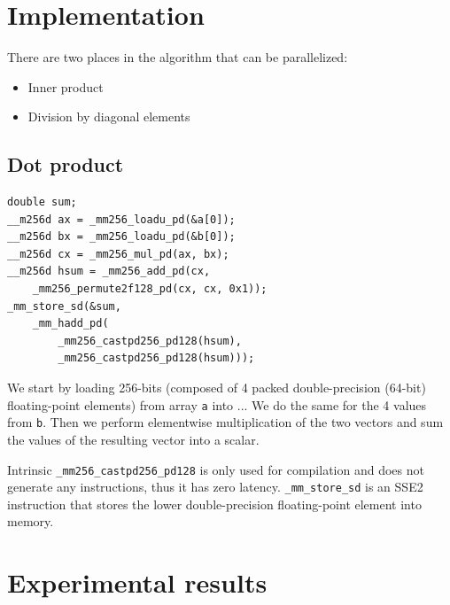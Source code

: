 \documentclass[sigplan]{acmart}
\begin{document}
\section{Implementation}
There are two places in the algorithm that can be parallelized:

\begin{itemize}
\item Inner product
\item Division by diagonal elements
\end{itemize}


\subsection{Dot product}

\lstset {language=C++}
\begin{lstlisting}
double sum;
__m256d ax = _mm256_loadu_pd(&a[0]);
__m256d bx = _mm256_loadu_pd(&b[0]);
__m256d cx = _mm256_mul_pd(ax, bx);
__m256d hsum = _mm256_add_pd(cx,
    _mm256_permute2f128_pd(cx, cx, 0x1));
_mm_store_sd(&sum,
    _mm_hadd_pd(
        _mm256_castpd256_pd128(hsum),
        _mm256_castpd256_pd128(hsum)));
\end{lstlisting}

We start by loading 256-bits (composed of 4 packed double-precision (64-bit) floating-point elements) from array \texttt{a} into ... We do the same for the 4 values from \texttt{b}. Then we perform elementwise multiplication of the two vectors and sum the values of the resulting vector into a scalar.

Intrinsic \texttt{\_mm256\_castpd256\_pd128} is only used for compilation and does not generate any instructions, thus it has zero latency. \texttt{\_mm\_store\_sd} is an SSE2 instruction that stores the lower double-precision floating-point element into memory.

\section{Experimental results}
\end{document}
